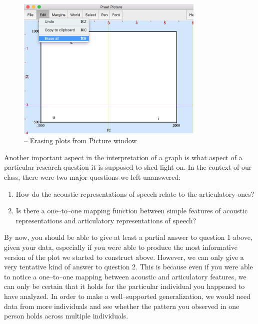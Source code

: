\begin{figure}[!tbp]
\caption{\Praat{} -- Erasing plots from Picture window}
\label{praat-erase-plots}
	\begin{center}
		\includegraphics[width=0.8\textwidth]{./figures/Praat-Erase-Plots}
	\end{center}
\end{figure}

Another important aspect in the interpretation of a graph is what aspect of a particular research question it is supposed to shed light on. In the context of our class, there were two major questions we left unanswered:

\begin{enumerate}
\item How do the acoustic representations of speech relate to the articulatory ones?
\item Is there a one--to--one mapping function between simple features of acoustic representations and articulatory representations of speech?
\end{enumerate}

By now, you should be able to give at least a partial answer to question 1 above, given your data, especially if you were able to produce the most informative version of the plot we started to construct above. However, we can only give a very tentative kind of answer to question 2. This is because even if you were able to notice a one--to--one mapping between acoustic and articulatory features, we can only be certain that it holds for the particular individual you happened to have analyzed. In order to make a well--supported generalization, we would need data from more individuals and see whether the pattern you observed in one person holds across multiple individuals.

